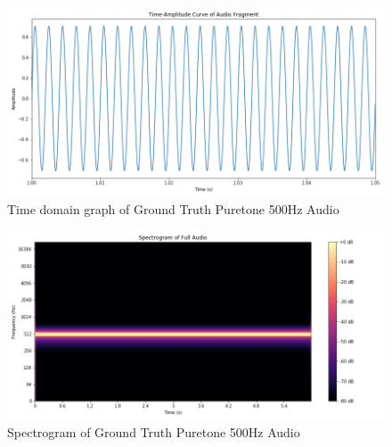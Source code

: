 \documentclass{ioereport}
\begin{document}
    \begin{figure}[H]
        \centering
        \includegraphics[width=\linewidth]{assets/audio_results/puretone500hztime.png}
        \caption{Time domain graph of Ground Truth Puretone 500Hz Audio}
        \label{fig:gt-pure500-time}
    \end{figure}
    \begin{figure}[H]
        \centering
        \includegraphics[width=\linewidth]{assets/audio_results/puretone500hzspec.png}
        \caption{Spectrogram of Ground Truth Puretone 500Hz Audio}
        \label{fig:gt-pure500-spec}
    \end{figure}
    
\end{document}
